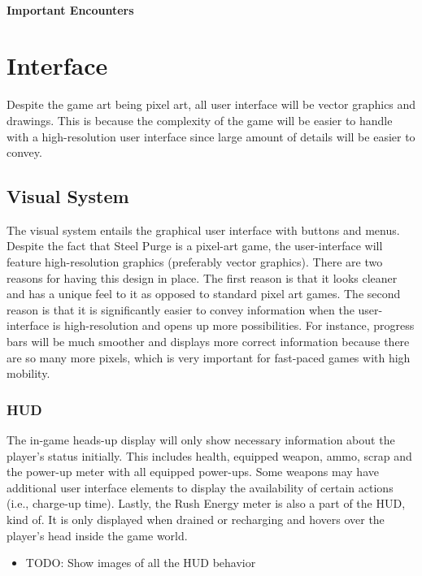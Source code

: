 \documentclass[12pt]{article}
\begin{document}
\paragraph{Important Encounters}

\section{Interface}

Despite the game art being pixel art, all user interface will be vector graphics and drawings. This is because the complexity of the game will be easier to handle with a high-resolution user interface since large amount of details will be easier to convey. 

\subsection{Visual System}

The visual system entails the graphical user interface with buttons and menus. Despite the fact that Steel Purge is a pixel-art game, the user-interface will feature high-resolution graphics (preferably vector graphics). There are two reasons for having this design in place. The first reason is that it looks cleaner and has a unique feel to it as opposed to standard pixel art games. The second reason is that it is significantly easier to convey information when the user-interface is high-resolution and opens up more possibilities. For instance, progress bars will be much smoother and displays more correct information because there are so many more pixels, which is very important for fast-paced games with high mobility. 

\subsubsection{HUD}

The in-game heads-up display will only show necessary information about the player's status initially. This includes health, equipped weapon, ammo, scrap and the power-up meter with all equipped power-ups. Some weapons may have additional user interface elements to display the availability of certain actions (i.e., charge-up time). Lastly, the Rush Energy meter is also a part of the HUD, kind of. It is only displayed when drained or recharging and hovers over the player's head inside the game world. 

\begin{itemize}
	\item TODO: Show images of all the HUD behavior
\end{itemize}
\end{document}
